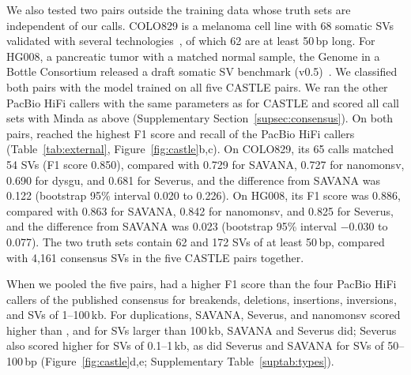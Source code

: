 We also tested two pairs outside the training data whose truth sets are independent of our calls.
COLO829 is a melanoma cell line with 68 somatic SVs validated with several technologies~\cite{colo829}, of which 62 are at least 50\,bp long.
For HG008, a pancreatic tumor with a matched normal sample, the Genome in a Bottle Consortium released a draft somatic SV benchmark (v0.5)~\cite{hg008}.
We classified both pairs with the model trained on all five CASTLE pairs.
We ran the other PacBio HiFi callers with the same parameters as for CASTLE and scored all call sets with Minda as above (Supplementary Section~\ref{supsec:consensus}).
On both pairs, \tool{} reached the highest F1 score and recall of the PacBio HiFi callers (Table~\ref{tab:external}, Figure~\ref{fig:castle}b,c).
On COLO829, its 65 calls matched 54 SVs (F1 score 0.850), compared with 0.729 for SAVANA, 0.727 for nanomonsv, 0.690 for dysgu, and 0.681 for Severus, and the difference from SAVANA was 0.122 (bootstrap 95\% interval 0.020 to 0.226).
On HG008, its F1 score was 0.886, compared with 0.863 for SAVANA, 0.842 for nanomonsv, and 0.825 for Severus, and the difference from SAVANA was 0.023 (bootstrap 95\% interval $-$0.030 to 0.077).
The two truth sets contain 62 and 172 SVs of at least 50\,bp, compared with 4,161 consensus SVs in the five CASTLE pairs together.

When we pooled the five pairs, \tool{} had a higher F1 score than the four PacBio HiFi callers of the published consensus for breakends, deletions, insertions, inversions, and SVs of 1--100\,kb.
For duplications, SAVANA, Severus, and nanomonsv scored higher than \tool{}, and for SVs larger than 100\,kb, SAVANA and Severus did; Severus also scored higher for SVs of 0.1--1\,kb, as did Severus and SAVANA for SVs of 50--100\,bp (Figure~\ref{fig:castle}d,e; Supplementary Table~\ref{suptab:types}).

